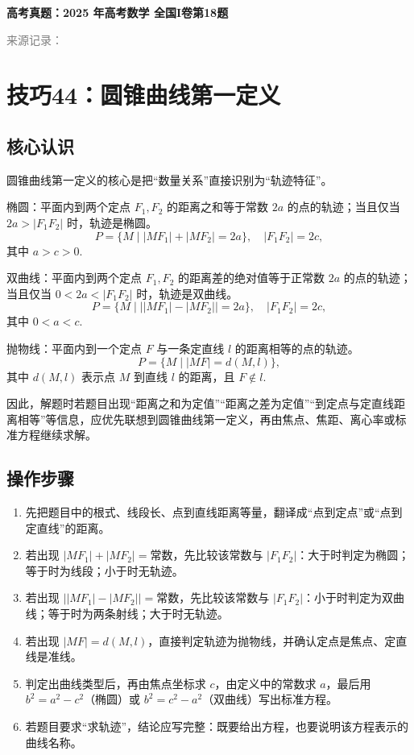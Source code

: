 \documentclass[UTF8,a4paper,11pt]{ctexart}
\newenvironment{gaokao}[1]{\par\medskip\noindent\textbf{高考真题：#1}\par\smallskip}{\par\medskip}
\begin{document}
\begin{gaokao}{2025 年高考数学 全国I卷第18题}
\par\smallskip\textcolor{gray}{\footnotesize 来源记录：\texttt{}}

\end{gaokao}

\clearpage

\section{技巧44：圆锥曲线第一定义}

\subsection*{核心认识}

圆锥曲线第一定义的核心是把“数量关系”直接识别为“轨迹特征”。

椭圆：平面内到两个定点 $F_1,F_2$ 的距离之和等于常数 $2a$ 的点的轨迹；当且仅当 $2a>|F_1F_2|$ 时，轨迹是椭圆。
\[
P=\{M\mid |MF_1|+|MF_2|=2a\},\quad |F_1F_2|=2c,
\]
其中 $a>c>0$.

双曲线：平面内到两个定点 $F_1,F_2$ 的距离差的绝对值等于正常数 $2a$ 的点的轨迹；当且仅当 $0<2a<|F_1F_2|$ 时，轨迹是双曲线。
\[
P=\{M\mid \bigl||MF_1|-|MF_2|\bigr|=2a\},\quad |F_1F_2|=2c,
\]
其中 $0<a<c$.

抛物线：平面内到一个定点 $F$ 与一条定直线 $l$ 的距离相等的点的轨迹。
\[
P=\{M\mid |MF|=d(M,l)\},
\]
其中 $d(M,l)$ 表示点 $M$ 到直线 $l$ 的距离，且 $F\notin l$.

因此，解题时若题目出现“距离之和为定值”“距离之差为定值”“到定点与定直线距离相等”等信息，应优先联想到圆锥曲线第一定义，再由焦点、焦距、离心率或标准方程继续求解。

\subsection*{操作步骤}

\begin{enumerate}

\item 先把题目中的根式、线段长、点到直线距离等量，翻译成“点到定点”或“点到定直线”的距离。

\item 若出现 $|MF_1|+|MF_2|=\text{常数}$，先比较该常数与 $|F_1F_2|$：大于时判定为椭圆；等于时为线段；小于时无轨迹。

\item 若出现 $\bigl||MF_1|-|MF_2|\bigr|=\text{常数}$，先比较该常数与 $|F_1F_2|$：小于时判定为双曲线；等于时为两条射线；大于时无轨迹。

\item 若出现 $|MF|=d(M,l)$，直接判定轨迹为抛物线，并确认定点是焦点、定直线是准线。

\item 判定出曲线类型后，再由焦点坐标求 $c$，由定义中的常数求 $a$，最后用 $b^2=a^2-c^2$（椭圆）或 $b^2=c^2-a^2$（双曲线）写出标准方程。

\item 若题目要求“求轨迹”，结论应写完整：既要给出方程，也要说明该方程表示的曲线名称。

\end{enumerate}
\end{document}
